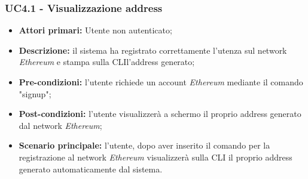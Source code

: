 \subsubsection{UC4.1 - Visualizzazione address}
\begin{itemize}
	\item \textbf{Attori primari:} Utente non autenticato;
	\item \textbf{Descrizione:} il sistema ha registrato correttamente l'utenza sul network \textit{Ethereum\glos} e stampa sulla CLI\glo l'address generato; 
	\item \textbf{Pre-condizioni:} l'utente richiede un account \textit{Ethereum\glo} mediante il comando "signup"; 
	\item \textbf{Post-condizioni:} l'utente visualizzerà a schermo il proprio address generato dal network \textit{Ethereum\glos};
	\item \textbf{Scenario principale:} l'utente, dopo aver inserito il comando per la registrazione al network \textit{Ethereum\glo} visualizzerà sulla CLI il proprio address generato automaticamente dal sistema.
\end{itemize}